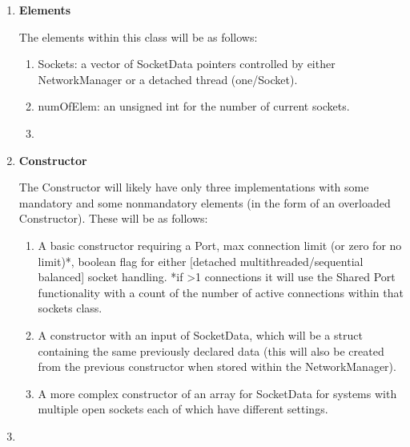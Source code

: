 \documentclass{article}
\begin{document}
\begin{enumerate}
	\item \textbf{Elements}

	      The elements within this class will be as follows:

	      \begin{enumerate}
		      \item Sockets: a vector of SocketData pointers controlled by either NetworkManager or a detached thread (one/Socket).
		      \item numOfElem: an unsigned int for the number of current sockets.
		      \item 
	      \end{enumerate}

	\item \textbf{Constructor}

	      The Constructor will likely have only three implementations with some mandatory and some nonmandatory elements (in the form of an overloaded Constructor). These will be as follows:

	      \begin{enumerate}
		      \item A basic constructor requiring a Port, max connection limit (or zero for no limit)*, boolean flag for either [detached multithreaded/sequential balanced] socket handling.
		            *if >1 connections it will use the Shared Port functionality with a count of the number of active connections within that sockets class.

		      \item A constructor with an input of SocketData, which will be a struct containing the same previously declared data (this will also be created from the previous constructor when stored within the NetworkManager).
		      \item A more complex constructor of an array for SocketData for systems with multiple open sockets each of which have different settings.
	      \end{enumerate}

	\item
\end{enumerate}
\end{document}
